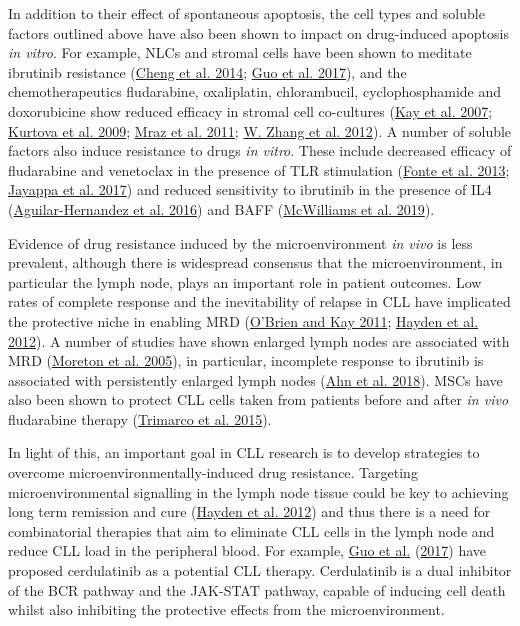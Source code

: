 \documentclass[11pt, a4paper, twosided]{book}
\begin{document}
In addition to their effect of spontaneous apoptosis, the cell types and soluble factors outlined above have also been shown to impact on drug-induced apoptosis \emph{in vitro}. For example, NLCs and stromal cells have been shown to meditate ibrutinib resistance (\protect\hyperlink{ref-Cheng2014}{Cheng et al. 2014}; \protect\hyperlink{ref-Guo2017}{Guo et al. 2017}), and the chemotherapeutics fludarabine, oxaliplatin, chlorambucil, cyclophosphamide and doxorubicine show reduced efficacy in stromal cell co-cultures (\protect\hyperlink{ref-Kay2007}{Kay et al. 2007}; \protect\hyperlink{ref-Kurtova2009}{Kurtova et al. 2009}; \protect\hyperlink{ref-Mraz2011}{Mraz et al. 2011}; \protect\hyperlink{ref-Zhang2012}{W. Zhang et al. 2012}). A number of soluble factors also induce resistance to drugs \emph{in vitro}. These include decreased efficacy of fludarabine and venetoclax in the presence of TLR stimulation (\protect\hyperlink{ref-Fonte2013}{Fonte et al. 2013}; \protect\hyperlink{ref-Jayappa2017}{Jayappa et al. 2017}) and reduced sensitivity to ibrutinib in the presence of IL4 (\protect\hyperlink{ref-AguilarHernandez2016}{Aguilar-Hernandez et al. 2016}) and BAFF (\protect\hyperlink{ref-McWilliams2019}{McWilliams et al. 2019}).

Evidence of drug resistance induced by the microenvironment \emph{in vivo} is less prevalent, although there is widespread consensus that the microenvironment, in particular the lymph node, plays an important role in patient outcomes. Low rates of complete response and the inevitability of relapse in CLL have implicated the protective niche in enabling MRD (\protect\hyperlink{ref-OBrien2011}{O'Brien and Kay 2011}; \protect\hyperlink{ref-Hayden2012}{Hayden et al. 2012}). A number of studies have shown enlarged lymph nodes are associated with MRD (\protect\hyperlink{ref-Moreton2005}{Moreton et al. 2005}), in particular, incomplete response to ibrutinib is associated with persistently enlarged lymph nodes (\protect\hyperlink{ref-Ahn2018}{Ahn et al. 2018}). MSCs have also been shown to protect CLL cells taken from patients before and after \emph{in vivo} fludarabine therapy (\protect\hyperlink{ref-Trimarco2015}{Trimarco et al. 2015}).

In light of this, an important goal in CLL research is to develop strategies to overcome microenvironmentally-induced drug resistance. Targeting microenvironmental signalling in the lymph node tissue could be key to achieving long term remission and cure (\protect\hyperlink{ref-Hayden2012}{Hayden et al. 2012}) and thus there is a need for combinatorial therapies that aim to eliminate CLL cells in the lymph node and reduce CLL load in the peripheral blood. For example, \protect\hyperlink{ref-Guo2017}{Guo et al.} (\protect\hyperlink{ref-Guo2017}{2017}) have proposed cerdulatinib as a potential CLL therapy. Cerdulatinib is a dual inhibitor of the BCR pathway and the JAK-STAT pathway, capable of inducing cell death whilst also inhibiting the protective effects from the microenvironment.
\end{document}
